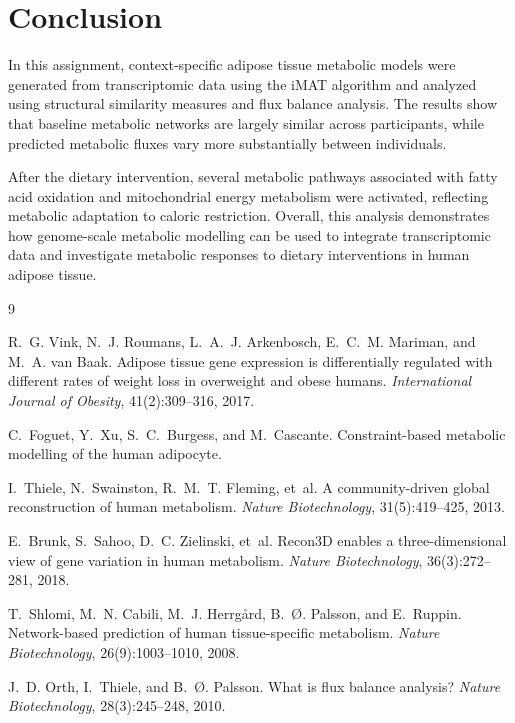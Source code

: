 \documentclass[11pt, a4paper]{article}
\begin{document}
\section{Conclusion}
\label{sec:conclusion}

In this assignment, context-specific adipose tissue metabolic models were generated from transcriptomic data using the iMAT algorithm and analyzed using structural similarity measures and flux balance analysis. The results show that baseline metabolic networks are largely similar across participants, while predicted metabolic fluxes vary more substantially between individuals.

After the dietary intervention, several metabolic pathways associated with fatty acid oxidation and mitochondrial energy metabolism were activated, reflecting metabolic adaptation to caloric restriction. Overall, this analysis demonstrates how genome-scale metabolic modelling can be used to integrate transcriptomic data and investigate metabolic responses to dietary interventions in human adipose tissue.



\begin{thebibliography}{9}

R.~G. Vink, N.~J. Roumans, L.~A.~J. Arkenbosch, E.~C.~M. Mariman, and M.~A. van Baak.
\newblock Adipose tissue gene expression is differentially regulated with different rates of weight loss in overweight and obese humans.
\newblock \textit{International Journal of Obesity}, 41(2):309--316, 2017.

C.~Foguet, Y.~Xu, S.~C.~Burgess, and M.~Cascante.
\newblock Constraint-based metabolic modelling of the human adipocyte.
\newblock 

I.~Thiele, N.~Swainston, R.~M.~T. Fleming, et~al.
\newblock A community-driven global reconstruction of human metabolism.
\newblock \textit{Nature Biotechnology}, 31(5):419--425, 2013.

E.~Brunk, S.~Sahoo, D.~C. Zielinski, et~al.
\newblock Recon3D enables a three-dimensional view of gene variation in human metabolism.
\newblock \textit{Nature Biotechnology}, 36(3):272--281, 2018.

T.~Shlomi, M.~N. Cabili, M.~J. Herrgård, B.~Ø. Palsson, and E.~Ruppin.
\newblock Network-based prediction of human tissue-specific metabolism.
\newblock \textit{Nature Biotechnology}, 26(9):1003--1010, 2008.

J.~D. Orth, I.~Thiele, and B.~Ø. Palsson.
\newblock What is flux balance analysis?
\newblock \textit{Nature Biotechnology}, 28(3):245--248, 2010.

\end{thebibliography}
\end{document}
